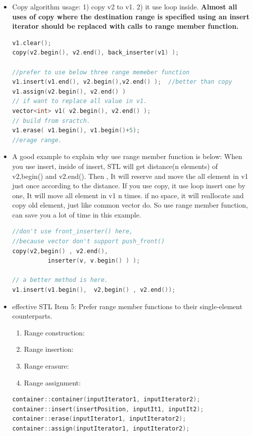 \documentclass[a4paper,12pt,twoside]{book}
\begin{document}
\begin{itemize}

\item Copy algorithm usage: 1) copy v2 to v1.  2) it use loop inside.  \textbf{Almost all uses of copy where the destination range is specified using an insert iterator should be replaced with calls to range member function.}

\begin{lstlisting}[frame=single, language=c++]
v1.clear();
copy(v2.begin(), v2.end(), back_inserter(v1) );

//prefer to use below three range memeber function
v1.insert(v1.end(), v2.begin(),v2.end() );  //better than copy
v1.assign(v2.begin(), v2.end() )
// if want to replace all value in v1.
vector<int> v1( v2.begin(), v2.end() );
// build from sractch.
v1.erase( v1.begin(), v1.begin()+5);
//erage range.
\end{lstlisting}

\item A good example to explain why use range member function is below: When you use insert, inside of insert,  STL will get distance(n elements) of v2,begin() and v2.end(). Then , It will reserve and move the all element in v1 just once according to the distance.  If you use copy, it use loop insert one by one, It will move all element in v1 n times. if no space, it will reallocate and copy old element, just like common vector do. So use range member function, can save you a lot of time in this example.

\begin{lstlisting}[frame=single, language=c++]
//don't use front_inserter() here,
//because vector don't support push_front()
copy(v2,begin() , v2.end(),
          inserter(v, v.begin() ) );

// a better method is here.
v1.insert(v1.begin(),  v2,begin() , v2.end());
\end{lstlisting}

\item effective STL Item 5: Prefer range member functions to their single-element counterparts.
\begin{enumerate}
\item Range construction:
\item Range insertion:
\item Range erasure:
\item Range assignment:
\end{enumerate}

\begin{lstlisting}[frame=single, language=c++]
container::container(inputIterator1, inputIterator2);
container::insert(insertPosition, inputIt1, inputIt2);
container::erase(inputIterator1, inputIterator2);
container::assign(inputIterator1, inputIterator2);
\end{lstlisting}



\end{itemize}
\end{document}

